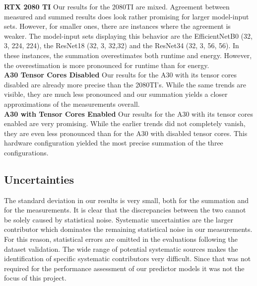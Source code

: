 \textbf{RTX 2080 TI} Our results for the 2080TI are mixed. Agreement between measured and summed results does look rather promising for larger model-input sets. However, for smaller ones, there are instances where the agreement is weaker. The model-input sets displaying this behavior are the EfficientNetB0 (32, 3, 224, 224), the ResNet18 (32, 3, 32,32) and the ResNet34 (32, 3, 56, 56). In these instances, the summation overestimates both runtime and energy. However, the overestimation is more pronounced for runtime than for energy. \\
\textbf{A30 Tensor Cores Disabled} Our results for the A30 with its tensor cores disabled are already more precise than the 2080TI's. While the same trends are visible, they are much less pronounced and our summation yields a closer approximations of the measurements overall. \\
\textbf{A30 with Tensor Cores Enabled} Our results for the A30 with its tensor cores enabled are very promising. While the earlier trends did not completely vanish, they are even less pronounced than for the A30 with disabled tensor cores. This hardware configuration yielded the most precise summation of the three configurations.



\subsection{Uncertainties}
The standard deviation in our results is very small, both for the summation and for the measurements. It is clear that the discrepancies between the two cannot be solely caused by statistical noise. Systematic uncertainties are the larger contributor which dominates the remaining statistical noise in our measurements. For this reason, statistical errors are omitted in the evaluations following the dataset validation. The wide range of potential systematic sources makes the identification of specific systematic contributors very difficult. Since that was not required for the performance assessment of our predictor models it was not the focus of this project. 





